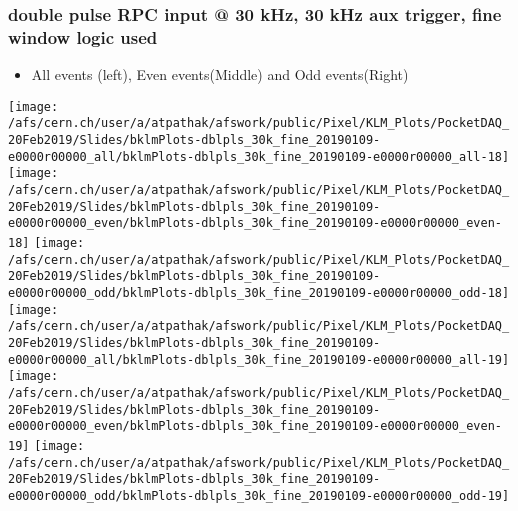 \documentclass{beamer}
\begin{document}
\begin{frame}
\frametitle{\small double pulse RPC input @ 30 kHz, 30 kHz aux trigger, fine window logic used}
\vspace*{.05cm}
\begin{center}
 \begin{itemize}
\item { \small All events (left), Even events(Middle) and Odd events(Right)}
\end{itemize}
\begin{normalsize}

\vspace*{-.2cm}
\begin{center}

\texttt{[image: /afs/cern.ch/user/a/atpathak/afswork/public/Pixel/KLM\_Plots/PocketDAQ\_20Feb2019/Slides/bklmPlots-dblpls\_30k\_fine\_20190109-e0000r00000\_all/bklmPlots-dblpls\_30k\_fine\_20190109-e0000r00000\_all-18]}
\texttt{[image: /afs/cern.ch/user/a/atpathak/afswork/public/Pixel/KLM\_Plots/PocketDAQ\_20Feb2019/Slides/bklmPlots-dblpls\_30k\_fine\_20190109-e0000r00000\_even/bklmPlots-dblpls\_30k\_fine\_20190109-e0000r00000\_even-18]}
\texttt{[image: /afs/cern.ch/user/a/atpathak/afswork/public/Pixel/KLM\_Plots/PocketDAQ\_20Feb2019/Slides/bklmPlots-dblpls\_30k\_fine\_20190109-e0000r00000\_odd/bklmPlots-dblpls\_30k\_fine\_20190109-e0000r00000\_odd-18]} \\

\texttt{[image: /afs/cern.ch/user/a/atpathak/afswork/public/Pixel/KLM\_Plots/PocketDAQ\_20Feb2019/Slides/bklmPlots-dblpls\_30k\_fine\_20190109-e0000r00000\_all/bklmPlots-dblpls\_30k\_fine\_20190109-e0000r00000\_all-19]}
\texttt{[image: /afs/cern.ch/user/a/atpathak/afswork/public/Pixel/KLM\_Plots/PocketDAQ\_20Feb2019/Slides/bklmPlots-dblpls\_30k\_fine\_20190109-e0000r00000\_even/bklmPlots-dblpls\_30k\_fine\_20190109-e0000r00000\_even-19]}
\texttt{[image: /afs/cern.ch/user/a/atpathak/afswork/public/Pixel/KLM\_Plots/PocketDAQ\_20Feb2019/Slides/bklmPlots-dblpls\_30k\_fine\_20190109-e0000r00000\_odd/bklmPlots-dblpls\_30k\_fine\_20190109-e0000r00000\_odd-19]} \\

\end{center}
\end{normalsize}
\end{center}
\end{frame}
\end{document}
